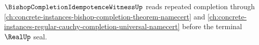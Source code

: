 $\BishopCompletionIdempotenceWitnessUp$ reads repeated completion through \autoref{ch:concrete-instances-bishop-completion-theorem-namecert} and \autoref{ch:concrete-instances-regular-cauchy-completion-universal-namecert} before the terminal $\RealUp$ seal.



